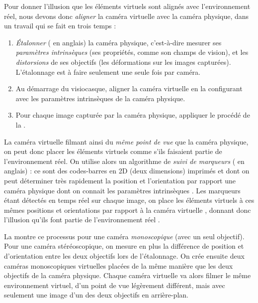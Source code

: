 Pour donner l'illusion que les éléments virtuels sont alignés avec l'environnement réel, nous devons donc \emph{aligner} la caméra virtuelle avec la caméra physique, dans un travail qui se fait en trois temps :
\begin{enumerate}
  \item \emph{Étalonner} ( en anglais) la caméra physique, c'est-à-dire mesurer ses \emph{paramètres intrinsèques} (ses propriétés, comme son champs de vision), et les \emph{distorsions} de ses objectifs (les déformations sur les images capturées). L'étalonnage est à faire seulement une seule fois par caméra.
  \item Au démarrage du visiocasque, aligner la caméra virtuelle en la configurant avec les paramètres intrinsèques de la caméra physique.
  \item Pour chaque image capturée par la caméra physique, appliquer le procédé de la .
\end{enumerate}
\bigskip

La caméra virtuelle filmant ainsi du \emph{même point de vue} que la caméra physique, on peut donc placer les éléments virtuels comme s'ils faisaient partie de l'environnement réel. On utilise alors un algorithme de \emph{suivi de marqueurs} ( en anglais) : ce sont des codes-barres en 2D (deux dimensions) imprimés  et dont on peut déterminer très rapidement la position et l'orientation par rapport une caméra physique dont on connait les paramètres intrinsèques \cite{Garrido-Jurado2014}. Les marqueurs étant détectés en temps réel sur chaque image, on place les éléments virtuels à ces mêmes positions et orientations par rapport à la caméra virtuelle , donnant donc l'illusion qu'ils font partie de l'environnement réel .

La  montre ce processus pour une caméra \emph{monoscopique} (avec un seul objectif). Pour une caméra stéréoscopique, on mesure en plus la différence de position et d'orientation entre les deux objectifs lors de l'étalonnage. On crée ensuite deux caméras monoscopiques virtuelles placées de la même manière que les deux objectifs de la caméra physique. Chaque caméra virtuelle va alors filmer le même environnement virtuel, d'un point de vue légèrement différent, mais avec seulement une image d'un des deux objectifs en arrière-plan.


